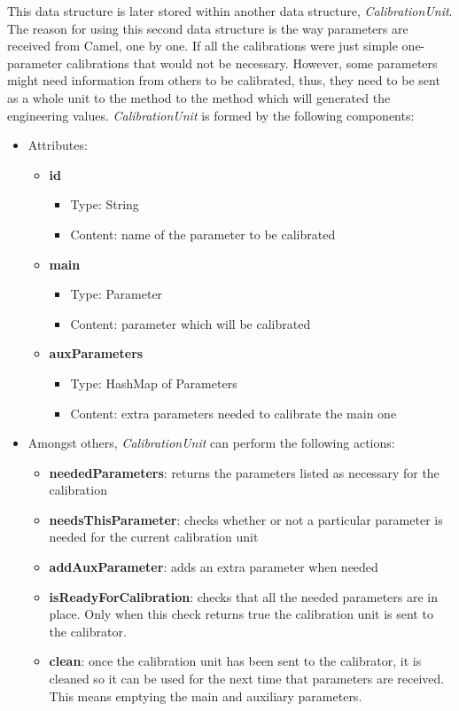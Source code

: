 This data structure is later stored within another data structure, \emph{CalibrationUnit}. The reason for using this second data structure is the way parameters are received from Camel, one by one. If all the calibrations were just simple one-parameter calibrations that would not be necessary. However, some parameters might need information from others to be calibrated, thus, they need to be sent as a whole unit to the method to the method which will generated the engineering values. \emph{CalibrationUnit} is formed by the following components:

\begin{itemize}
\item Attributes:
	\begin{itemize}
		\item \textbf{id}
			\begin{itemize}
				\item Type: String
				\item Content: name of the parameter to be calibrated
			\end{itemize}
		\item \textbf{main}
			\begin{itemize}
				\item Type: Parameter
				\item Content: parameter which will be calibrated
			\end{itemize}				
		\item \textbf{auxParameters}
			\begin{itemize}
				\item Type: HashMap of Parameters
				\item Content: extra parameters needed to calibrate the main one
			\end{itemize}												
		
	\end{itemize}
	
	\item Amongst others, \emph{CalibrationUnit} can perform the following actions:
	\begin{itemize}
		\item \textbf{neededParameters}: returns the parameters listed as necessary for the calibration
		\item \textbf{needsThisParameter}: checks whether or not a particular parameter is needed for the current calibration unit
		\item \textbf{addAuxParameter}: adds an extra parameter when needed
		\item \textbf{isReadyForCalibration}: checks that all the needed parameters are in place. Only when this check returns true the calibration unit is sent to the calibrator.
		\item \textbf{clean}: once the calibration unit has been sent to the calibrator, it is cleaned so it can be used for the next time that parameters are received. This means emptying the main and auxiliary parameters.
	\end{itemize}

\end{itemize}



